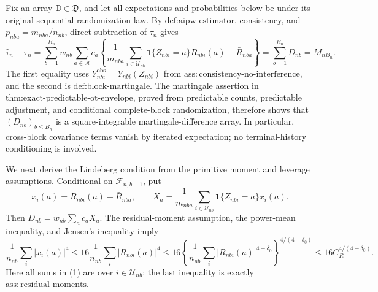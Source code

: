 Fix an array \(\mathbb D\in\mathfrak D\), and let all expectations and probabilities below be under its original sequential randomization law.  By \(\text{def:aipw-estimator}\), consistency, and \(p_{nba}=m_{nba}/n_{nb}\), direct subtraction of \(\tau_n\) gives
\[
\widehat\tau_n-\tau_n
=\sum_{b=1}^{B_n}w_{nb}\sum_{a\in\mathcal A}c_a
\left\{\frac1{m_{nba}}\sum_{i\in\mathcal U_{nb}}
\mathbf 1\{Z_{nbi}=a\}R_{nbi}(a)-\bar R_{nba}\right\}
=\sum_{b=1}^{B_n}D_{nb}=M_{nB_n}.
\]
The first equality uses \(Y_{nbi}^{\mathrm{obs}}=Y_{nbi}(Z_{nbi})\) from \(\mathrm{ass:consistency\text{-}no\text{-}interference}\), and the second is \(\text{def:block-martingale}\).  The martingale assertion in \(\text{thm:exact-predictable-ot-envelope}\), proved from predictable counts, predictable adjustment, and conditional complete-block randomization, therefore shows that \((D_{nb})_{b\le B_n}\) is a square-integrable martingale-difference array.  In particular, cross-block covariance terms vanish by iterated expectation; no terminal-history conditioning is involved.

We next derive the Lindeberg condition from the primitive moment and leverage assumptions.  Conditional on \(\mathcal F_{n,b-1}\), put
\[
x_i(a)=R_{nbi}(a)-\bar R_{nba},\qquad
X_a=\frac1{m_{nba}}\sum_{i\in\mathcal U_{nb}}
\mathbf 1\{Z_{nbi}=a\}x_i(a).
\]
Then \(D_{nb}=w_{nb}\sum_a c_aX_a\).  The residual-moment assumption, the power-mean inequality, and Jensen's inequality imply
\[
\frac1{n_{nb}}\sum_i|x_i(a)|^4
\le16\frac1{n_{nb}}\sum_i|R_{nbi}(a)|^4
\le16\left\{\frac1{n_{nb}}\sum_i|R_{nbi}(a)|^{4+\delta_0}\right\}^{4/(4+\delta_0)}
\le16C_R^{4/(4+\delta_0)}.
\tag{1}
\]
Here all sums in (1) are over \(i\in\mathcal U_{nb}\); the last inequality is exactly \(\mathrm{ass:residual\text{-}moments}\).

